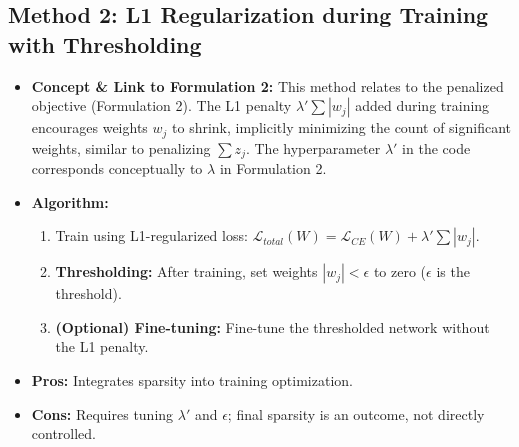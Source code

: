 \documentclass[10pt, article]{article} %
\begin{document}
\subsection{Method 2: L1 Regularization during Training with Thresholding}
\begin{itemize}
    \item \textbf{Concept \& Link to Formulation 2:} This method relates to the penalized objective (Formulation 2). The L1 penalty $\lambda' \sum |w_j|$ added during training encourages weights $w_j$ to shrink, implicitly minimizing the count of significant weights, similar to penalizing $\sum z_j$. The hyperparameter $\lambda'$ in the code corresponds conceptually to $\lambda$ in Formulation 2.
    \item \textbf{Algorithm:}
    \begin{enumerate} %
        \item Train using L1-regularized loss: $\mathcal{L}_{total}(W) = \mathcal{L}_{CE}(W) + \lambda' \sum |w_j|$.
        \item \textbf{Thresholding:} After training, set weights $|w_j| < \epsilon$ to zero ($\epsilon$ is the threshold).
        \item \textbf{(Optional) Fine-tuning:} Fine-tune the thresholded network without the L1 penalty.
    \end{enumerate} %
    \item \textbf{Pros:} Integrates sparsity into training optimization.
    \item \textbf{Cons:} Requires tuning $\lambda'$ and $\epsilon$; final sparsity is an outcome, not directly controlled.
\end{itemize}
\end{document}
